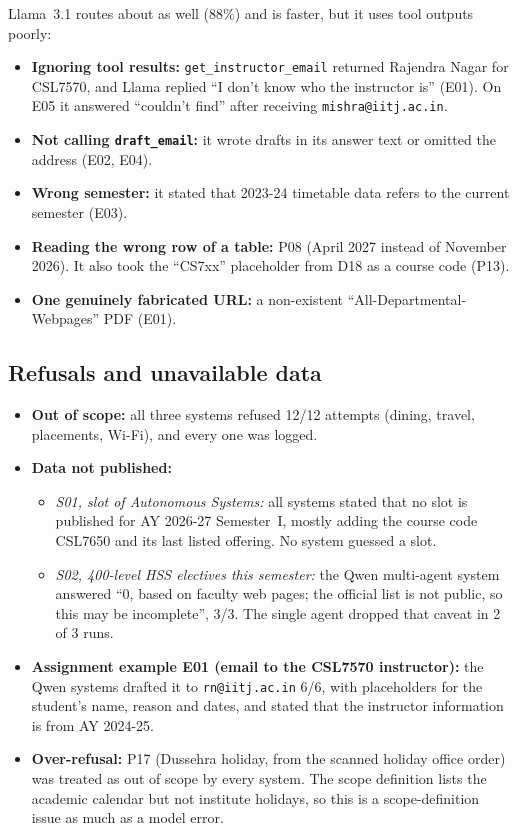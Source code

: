 \documentclass[11pt,a4paper]{article}
\newcommand{\code}[1]{\texttt{#1}}
\begin{document}
\medskip
\noindent Llama~3.1 routes about as well (88\%) and is faster, but it uses tool outputs poorly:
\begin{itemize}
  \item \textbf{Ignoring tool results:} \code{get\_instructor\_email} returned Rajendra Nagar for CSL7570, and Llama
        replied ``I don't know who the instructor is'' (E01). On E05 it answered ``couldn't find'' after receiving
        \code{mishra@iitj.ac.in}.
  \item \textbf{Not calling \code{draft\_email}:} it wrote drafts in its answer text or omitted the address (E02, E04).
  \item \textbf{Wrong semester:} it stated that 2023-24 timetable data refers to the current semester (E03).
  \item \textbf{Reading the wrong row of a table:} P08 (April 2027 instead of November 2026). It also took the
        ``CS7xx'' placeholder from D18 as a course code (P13).
  \item \textbf{One genuinely fabricated URL:} a non-existent ``All-Departmental-Webpages'' PDF (E01).
\end{itemize}

\subsection{Refusals and unavailable data}
\begin{itemize}
  \item \textbf{Out of scope:} all three systems refused 12/12 attempts (dining, travel, placements, Wi-Fi), and
        every one was logged.
  \item \textbf{Data not published:}
    \begin{itemize}
      \item \emph{S01, slot of Autonomous Systems:} all systems stated that no slot is published for AY 2026-27
            Semester~I, mostly adding the course code CSL7650 and its last listed offering. No system guessed a slot.
      \item \emph{S02, 400-level HSS electives this semester:} the Qwen multi-agent system answered ``0, based on
            faculty web pages; the official list is not public, so this may be incomplete'', 3/3. The single agent
            dropped that caveat in 2 of 3 runs.
    \end{itemize}
  \item \textbf{Assignment example E01 (email to the CSL7570 instructor):} the Qwen systems drafted it to
        \code{rn@iitj.ac.in} 6/6, with placeholders for the student's name, reason and dates, and stated that the
        instructor information is from AY 2024-25.
  \item \textbf{Over-refusal:} P17 (Dussehra holiday, from the scanned holiday office order) was treated as out of
        scope by every system. The scope definition lists the academic calendar but not institute holidays, so this
        is a scope-definition issue as much as a model error.
\end{itemize}
\end{document}
